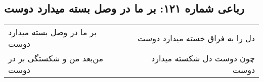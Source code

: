\begin{center}
\section*{رباعی شماره ۱۲۱: بر ما در وصل بسته میدارد دوست}
\label{sec:sh121}
\begin{longtable}{l p{0.5cm} r}
بر ما در وصل بسته میدارد دوست
&&
دل را به فراق خسته میدارد دوست
\\
من‌بعد من و شکستگی بر در دوست
&&
چون دوست دل شکسته میدارد دوست
\\
\end{longtable}
\end{center}
